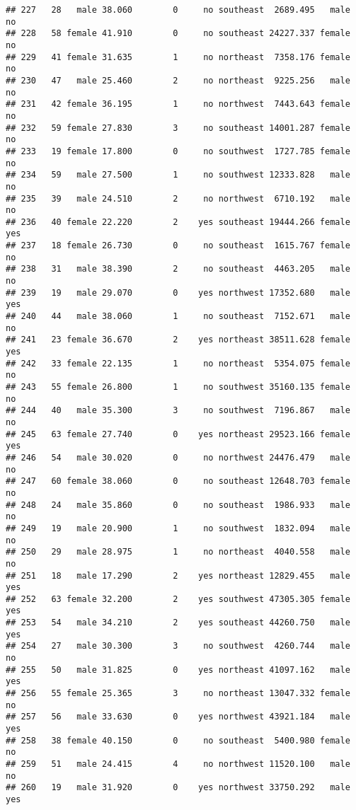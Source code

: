 \documentclass[
]{article}
\begin{document}
\begin{verbatim}
## 227   28   male 38.060        0     no southeast  2689.495   male       no
## 228   58 female 41.910        0     no southeast 24227.337 female       no
## 229   41 female 31.635        1     no northeast  7358.176 female       no
## 230   47   male 25.460        2     no northeast  9225.256   male       no
## 231   42 female 36.195        1     no northwest  7443.643 female       no
## 232   59 female 27.830        3     no southeast 14001.287 female       no
## 233   19 female 17.800        0     no southwest  1727.785 female       no
## 234   59   male 27.500        1     no southwest 12333.828   male       no
## 235   39   male 24.510        2     no northwest  6710.192   male       no
## 236   40 female 22.220        2    yes southeast 19444.266 female      yes
## 237   18 female 26.730        0     no southeast  1615.767 female       no
## 238   31   male 38.390        2     no southeast  4463.205   male       no
## 239   19   male 29.070        0    yes northwest 17352.680   male      yes
## 240   44   male 38.060        1     no southeast  7152.671   male       no
## 241   23 female 36.670        2    yes northeast 38511.628 female      yes
## 242   33 female 22.135        1     no northeast  5354.075 female       no
## 243   55 female 26.800        1     no southwest 35160.135 female       no
## 244   40   male 35.300        3     no southwest  7196.867   male       no
## 245   63 female 27.740        0    yes northeast 29523.166 female      yes
## 246   54   male 30.020        0     no northwest 24476.479   male       no
## 247   60 female 38.060        0     no southeast 12648.703 female       no
## 248   24   male 35.860        0     no southeast  1986.933   male       no
## 249   19   male 20.900        1     no southwest  1832.094   male       no
## 250   29   male 28.975        1     no northeast  4040.558   male       no
## 251   18   male 17.290        2    yes northeast 12829.455   male      yes
## 252   63 female 32.200        2    yes southwest 47305.305 female      yes
## 253   54   male 34.210        2    yes southeast 44260.750   male      yes
## 254   27   male 30.300        3     no southwest  4260.744   male       no
## 255   50   male 31.825        0    yes northeast 41097.162   male      yes
## 256   55 female 25.365        3     no northeast 13047.332 female       no
## 257   56   male 33.630        0    yes northwest 43921.184   male      yes
## 258   38 female 40.150        0     no southeast  5400.980 female       no
## 259   51   male 24.415        4     no northwest 11520.100   male       no
## 260   19   male 31.920        0    yes northwest 33750.292   male      yes

\end{verbatim}
\end{document}
